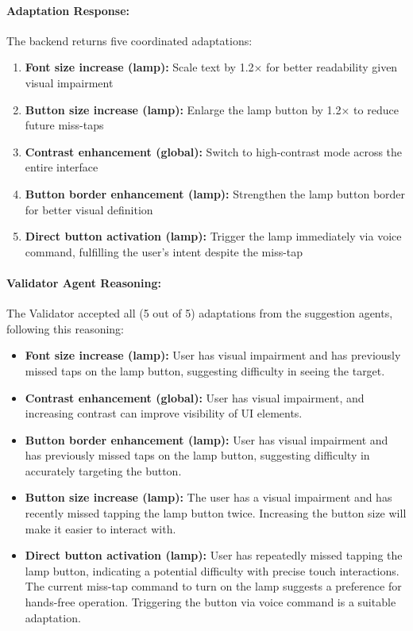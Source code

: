 \paragraph{Adaptation Response:} The backend returns five coordinated adaptations:
\begin{enumerate}
    \item \textbf{Font size increase (lamp):} Scale text by 1.2× for better readability given visual impairment
    \item \textbf{Button size increase (lamp):} Enlarge the lamp button by 1.2× to reduce future miss-taps
    \item \textbf{Contrast enhancement (global):} Switch to high-contrast mode across the entire interface
    \item \textbf{Button border enhancement (lamp):} Strengthen the lamp button border for better visual definition
    \item \textbf{Direct button activation (lamp):} Trigger the lamp immediately via voice command, fulfilling the user's intent despite the miss-tap
\end{enumerate}
\paragraph{Validator Agent Reasoning:} The Validator accepted all (5 out of 5) adaptations from the suggestion agents, following this reasoning:
\begin{itemize}
    \item \textbf{Font size increase (lamp):} User has visual impairment and has previously missed taps on the lamp button, suggesting difficulty in seeing the target.
    \item \textbf{Contrast enhancement (global):} User has visual impairment, and increasing contrast can improve visibility of UI elements.
    \item \textbf{Button border enhancement (lamp):} User has visual impairment and has previously missed taps on the lamp button, suggesting difficulty in accurately targeting the button.
    \item \textbf{Button size increase (lamp):} The user has a visual impairment and has recently missed tapping the lamp button twice. Increasing the button size will make it easier to interact with.
    \item \textbf{Direct button activation (lamp):} User has repeatedly missed tapping the lamp button, indicating a potential difficulty with precise touch interactions. The current miss-tap command to turn on the lamp suggests a preference for hands-free operation. Triggering the button via voice command is a suitable adaptation.
\end{itemize}

